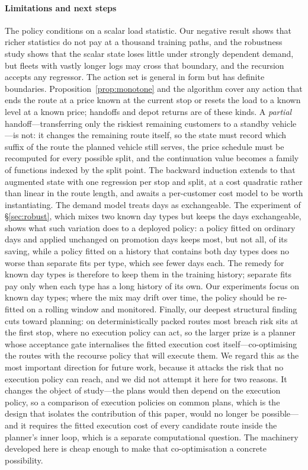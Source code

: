 \documentclass[preprint,authoryear,12pt]{elsarticle}
\theoremstyle{definition}
\theoremstyle{remark}
\begin{document}
\paragraph{Limitations and next steps} The policy conditions on a
scalar load statistic. Our negative result shows that richer statistics
do not pay at a thousand training paths, and the robustness study shows
that the scalar state loses little under strongly dependent demand, but
fleets with vastly longer logs may cross that boundary, and the
recursion accepts any regressor. The action set is general in form but
has definite boundaries. Proposition~\ref{prop:monotone} and the
algorithm cover any action that ends the route at a price known at the
current stop or resets the load to a known level at a known price;
handoffs and depot returns are of these kinds. A \emph{partial}
handoff---transferring only the riskiest remaining customers to a
standby vehicle---is not: it changes the remaining route itself, so the
state must record which suffix of the route the planned vehicle still
serves, the price schedule must be recomputed for every possible split,
and the continuation value becomes a family of functions indexed by the
split point. The backward induction extends to that augmented state
with one regression per stop and split, at a cost quadratic rather than
linear in the route length, and awaits a per-customer cost model to be
worth instantiating. The demand model treats days as exchangeable. The
experiment of \S\ref{sec:robust}, which mixes two known day types but
keeps the days exchangeable, shows what such variation does to a
deployed policy: a policy fitted on ordinary days and applied
unchanged on promotion days keeps most, but not all, of its saving,
while a policy fitted on a history that contains both day types does no
worse than separate fits per type, which see fewer days each. The remedy
for known day types is therefore to keep them in the training history;
separate fits pay only when each type has a long history of its own.
Our experiments focus on known day types; where the mix may drift over
time, the policy should be re-fitted on
a rolling window and monitored. Finally, our deepest structural finding cuts toward planning:
on deterministically packed routes most breach risk sits at the first
stop, where no execution policy can act, so the larger prize is a
planner whose acceptance gate internalises the fitted execution cost
itself---co-optimising the routes with the recourse policy that will
execute them. We regard this as the most important direction for future
work, because it attacks the risk that no execution policy can reach,
and we did not attempt it here for two reasons. It changes the object of
study---the plans would then depend on the execution policy, so a
comparison of execution policies on common plans, which is the design
that isolates the contribution of this paper, would no longer be
possible---and it requires the fitted execution cost of every candidate
route inside the planner's inner loop, which is a separate
computational question. The machinery developed here is cheap enough
to make that co-optimisation a concrete possibility.
\end{document}
